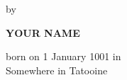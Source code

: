 \documentclass{article}
\newlength{\whitespace}
\begin{document}
\begin{center}
\begin{minipage}[c][220mm][c]{124mm}
\begin{center}
      \vspace{4\whitespace}

      {\fontsize{14pt}{16pt}\selectfont by}

      \vspace{4\whitespace}

      {\fontsize{14pt}{16pt}\selectfont\textbf{YOUR NAME}}

      \vspace{\whitespace}

      {\fontsize{12pt}{14pt}\selectfont
        born on 1 January 1001 in \\
        Somewhere in Tatooine
      }

  \end{center}
  \makeatother

\end{minipage}
\end{center}

\clearpage
\end{document}
